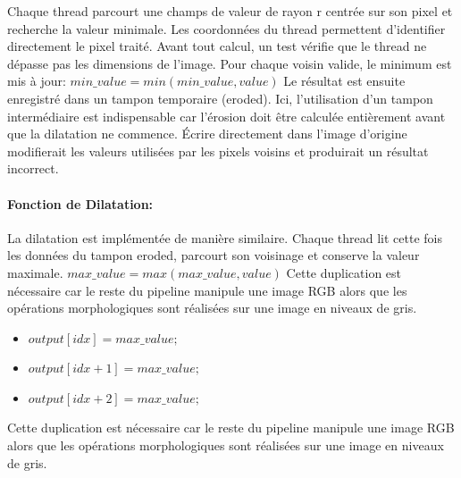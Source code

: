 \documentclass[12pt]{article}
\begin{document}
    Chaque thread parcourt une  champs de valeur de rayon r centrée sur son pixel et recherche la valeur minimale. Les coordonnées du thread permettent d'identifier directement le pixel traité. Avant tout calcul, un test vérifie que le thread ne dépasse pas les dimensions de l'image. Pour chaque voisin valide, le minimum est mis à jour:
    \(min\_value = min(min\_value,value)\)
    Le résultat est ensuite enregistré dans un tampon temporaire (eroded). Ici,
l'utilisation d'un tampon intermédiaire est indispensable car l'érosion doit être calculée entièrement avant que la dilatation ne commence. Écrire directement dans l'image d'origine modifierait les valeurs utilisées par les pixels voisins et produirait un résultat incorrect.
    
    \paragraph{Fonction de Dilatation: }
    La dilatation est implémentée de manière similaire. Chaque thread lit cette fois les données du tampon eroded, parcourt son voisinage et conserve la valeur maximale.
    \(max\_value=max(max\_value,value)\)
    Cette duplication est nécessaire car le reste du pipeline manipule une image RGB alors que les opérations morphologiques sont réalisées sur une image en niveaux de gris.
    \begin{itemize}
        \item \(output[idx]     = max\_value;\)
        \item \(output[idx + 1] = max\_value;\)
        \item \(output[idx + 2] = max\_value;\)
    \end{itemize}
    Cette duplication est nécessaire car le reste du pipeline manipule une image RGB alors que les opérations morphologiques sont réalisées sur une image en niveaux de gris.
\end{document}
